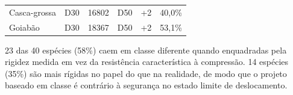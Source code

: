 \begin{table}[!ht]
\begin{threeparttable}
\begin{tabular*}{\columnwidth}{@{\extracolsep{\fill}}llrrrr@{\extracolsep{\fill}}}
Casca-grossa & D30 & 16802 & D50 & +2 & 40,0\% \\
Goiabão & D30 & 18367 & D50 & +2 & 53,1\% \\
\bottomrule
\end{tabular*}
\begin{tablenotes}\footnotesize
\item 23 das 40 espécies (58\%) caem em classe diferente quando enquadradas pela rigidez medida em vez da resistência característica à compressão. 14 espécies (35\%) são mais rígidas no papel do que na realidade, de modo que o projeto baseado em classe é contrário à segurança no estado limite de deslocamento.
\end{tablenotes}
\end{threeparttable}
\end{table}
